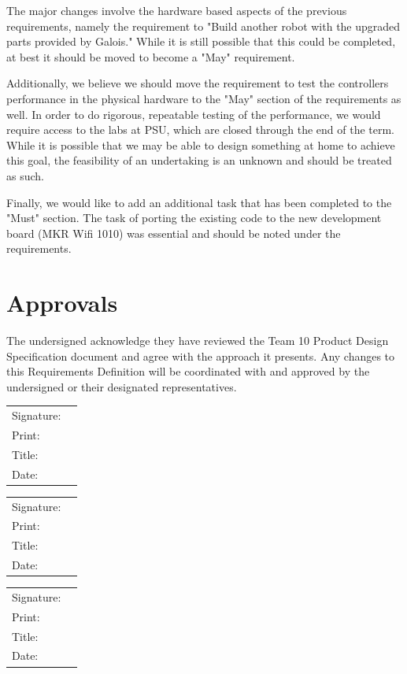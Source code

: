 \documentclass[a4paper,12pt]{article}
\begin{document}
The major changes involve the hardware based aspects of the previous requirements, namely the requirement to 
"Build another robot with the upgraded parts provided by Galois." While it is still possible that this could be completed, at best it should be moved to become a "May" requirement.

Additionally, we believe we should move the requirement to test the controllers performance in the physical hardware to the "May" section of the requirements as well. In order to do rigorous, repeatable testing of the performance, we would require access to the labs at PSU, which are closed through the end of the term. While it is possible that we may be able to design something at home to achieve this goal, the feasibility of an undertaking is an unknown and should be treated as such.

Finally, we would like to add an additional task that has been completed to the "Must" section. The task of porting the existing code to the new development board (MKR Wifi 1010) was essential and should be noted under the requirements.


\section{Approvals}
The undersigned acknowledge they have reviewed the Team 10 Product Design Specification document and agree with the approach it presents. Any changes to this Requirements Definition will be coordinated with and approved by the undersigned or their designated representatives.

\vspace{1cm}
\begin{tabular}{@{}p{.75in}p{4in}@{}}
Signature: & \hrulefill \\
Print: & \hrulefill \\
Title: & \hrulefill \\
Date: & \hrulefill \\
\end{tabular}

\vspace{1cm}
\begin{tabular}{@{}p{.75in}p{4in}@{}}
Signature: & \hrulefill \\
Print: & \hrulefill \\
Title: & \hrulefill \\
Date: & \hrulefill \\
\end{tabular}

\vspace{1cm}
\begin{tabular}{@{}p{.75in}p{4in}@{}}
Signature: & \hrulefill \\
Print: & \hrulefill \\
Title: & \hrulefill \\
Date: & \hrulefill \\
\end{tabular}

\newpage


\end{document}

